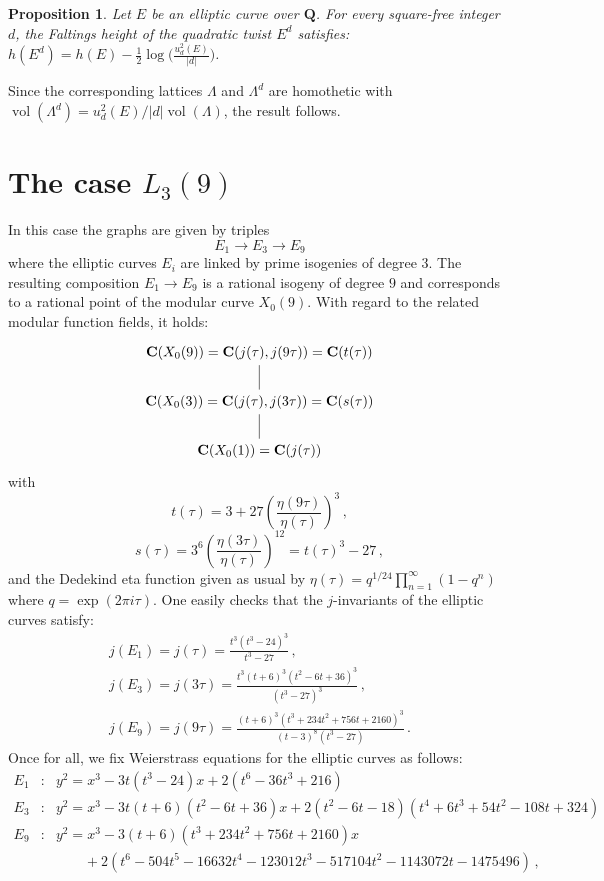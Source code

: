 \documentclass[
  journal=small,
  manuscript=article-type,  %
  year=2020,
  volume=37,
]{cup-journal}
\newtheorem{prop}{Proposition}
\begin{document}
\begin{prop}
Let $E$ be an elliptic curve over $\mathbf{Q}$.
For every square-free integer $d$, the Faltings height of the quadratic twist $E^d$ satisfies:
$\displaystyle{h(E^d) = h(E) -\frac{1}{2}\log(
\frac{u_d^2(E)}{|d|}})$.
\end{prop}

 Since the corresponding lattices $\Lambda$ and $\Lambda^d$ are homothetic with $\operatorname{vol}(\Lambda^d)=u_d^2(E)/|d| \operatorname{vol}(\Lambda)$, the result follows.


\section{The case $L_3(9)$}

In this case the graphs are given by triples
$$
E_1 \longrightarrow E_3 \longrightarrow E_9
$$
where the elliptic curves  $E_i$ are linked by prime isogenies of degree $3$.
The resulting composition $E_1\longrightarrow E_9$ is a rational isogeny of degree $9$ and corresponds to a rational point of the modular curve 
$X_0(9)$.
With regard to the related modular function fields, it holds:
$$
\begin{tikzcd}[left]
    \mathbf{C}(X_0(9)) = \mathbf{C}(j(\tau),j(9\tau)) = \mathbf{C}(t(\tau))
    \arrow[d,-] \\
    \mathbf{C}(X_0(3))= \mathbf{C}(j(\tau),j(3\tau)) = \mathbf{C}(s(\tau))
    \arrow[d,-] \\
    \mathbf{C}(X_0(1))=\mathbf{C}(j(\tau))
\end{tikzcd}
$$
with
$$t(\tau)= 3+27 \left( \frac{\eta(9\tau)}{\eta(\tau)}\right)^3\,,$$ 
$$s(\tau) = 3^6 \left( \frac{\eta(3\tau)}{\eta(\tau)}\right)^{12}= t(\tau)^3-27\,,$$ and
the Dedekind eta function given as usual by $\eta(\tau)=q^{1/24}\prod_{n=1}^\infty 
(1-q^n)$ where $q=\exp(2\pi i \tau)$.
One easily checks that the $j$-invariants of the elliptic curves satisfy:
$$
\begin{array}{l}
j(E_1)=j(\tau)= \displaystyle{\frac{t^3 (t^3 - 24)^3}{t^3 - 27} }\,,\\[6mm]
j(E_3)=j(3\tau)= \displaystyle{\frac{t^3 (t+6 )^3 (t^2-6t+36)^3}{(t^3 - 27)^3}} \,,\\[6mm]
j(E_9)=j(9\tau)= \displaystyle{\frac{(t + 6)^3 (t^3 + 234 t^2 + 756 t + 2160)^3}{(t - 3)^8 (t^3 - 27)}} \,.
\end{array}
$$
Once for all, we fix Weierstrass equations for the elliptic curves as follows:
$$
\begin{array}{rcl}
    E_1 & : & y^2=x^3-3t(t^3 - 24)x+2(t^6 - 36t^3 + 216) \\[3mm]
    E_3 & : & y^2=x^3-3t(t + 6)(t^2 - 6t + 36)x+2(t^2 - 6t - 18)(t^4 + 6t^3 + 54t^2 - 108t + 324) \\[3mm]
    E_9 & : & y^2=x^3-3(t + 6)(t^3 + 234t^2 + 756t + 2160)x\\
    & & \qquad +2(t^6 - 504t^5 - 16632t^4 - 123012t^3 - 517104t^2 - 1143072t - 1475496) \,,
\end{array}
$$
\end{document}
